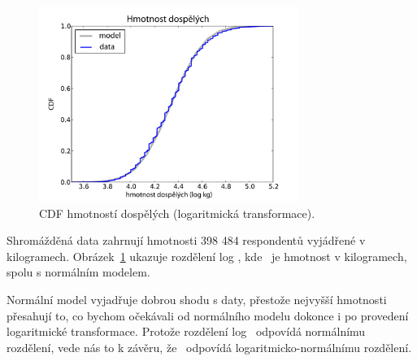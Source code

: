 \documentclass[12pt]{book}
\begin{document}
\begin{figure}
\centerline{
\includegraphics[height=2.5in]{figs/brfss_weight_log.pdf}
}
\caption{CDF hmotností dospělých (logaritmická transformace).}
\label{brfss_weight_log}
\end{figure}

Shromážděná data zahrnují hmotnosti 398 484 respondentů vyjádřené v kilogramech.
Obrázek~\ref{brfss_weight_log} ukazuje rozdělení log \w, kde \w~je hmotnost v kilogramech, spolu s normálním modelem.

Normální model vyjadřuje dobrou shodu s daty, přestože nejvyšší hmotnosti přesahují to, co bychom očekávali od normálního modelu dokonce i po provedení logaritmické transformace.  Protože rozdělení log \w~odpovídá normálnímu rozdělení, vede nás to k závěru, že \w~odpovídá logaritmicko-normálnímu rozdělení.





\end{document}
